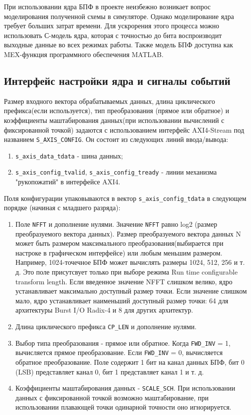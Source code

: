 При использовании ядра БПФ в проекте неизбежно возникает вопрос моделирования полученной схемы в симуляторе. Однако моделирование ядра требует больших затрат времени. Для ускрорения этого процесса можно использовать С-модель ядра, которая с точностью до бита воспроизводит выходные данные во всех режимах работы. Также модель БПФ доступна как MEX-функция программного обеспечения MATLAB.

\subsection{Интерфейс настройки ядра и сигналы событий}

Размер входного вектора обрабатываемых данных, длина циклического префикса(если используется), тип преобразования (прямое или обратное) и коэффициенты маштабирования данных(при использовании вычислений с фиксированной точкой) задаются с использованием интерфейс AXI4-Stream под названием \verb|S_AXIS_CONFIG|. 
Он состоит из следующих линий ввода/вывода: 

\begin{enumerate}
	\item \verb|s_axis_data_tdata| - шина данных;
	\item \verb|s_axis_config_tvalid|, \verb|s_axis_config_tready| - линии механизма "рукопожатий" в интерфейсе AXI4.
\end{enumerate}

Поля конфигурации упаковываются в вектор \verb|s_axis_config_tdata| в следующем порядке (начиная с младшего разряда):

\begin{enumerate}
	\item Поле \verb|NFFT| и дополнение нулями. Значение \verb|NFFT| равно log2 (размер преобразуемого вектора данных). Размер преобразуемого вектора данных N может быть размером максимального преобразования(выбирается при настроке в графическом интерфейсе) или любым меньшим размером. Например, 1024-точечное БПФ может вычислять размеры 1024, 512, 256 и т. д. Это поле присутсвует только при выборе режима Run time configurable transform length. Если введенное значение NFFT слишком велико, ядро устанавливает максимально доступный размер точки. Если значение слишком мало, ядро устанавливает наименьший доступный размер точки: 64 для архитектуры Burst I/O Radix-4 и 8 для других архитектур. 
	\item Длина циклического префикса \verb|CP_LEN| и дополнение нулями.
	\item Выбор типа преобразования - прямое или обратное. Когда \verb|FWD_INV| = 1, вычисляется прямое преобразование. Если \verb|FWD_INV| = 0, вычисляется обратное преобразование. Поле содержит 1 бит на канал данных БПФ, бит 0 (LSB) представляет канал 0, бит 1 представляет канал 1 и т. д.
	\item Коэффициенты маштабирования данных - \verb|SCALE_SCH|. При использовании данных с фиксированной точкой возможно маштабирование, при использовании плавающей точки одинарной точности оно игнорируется.
\end{enumerate}

